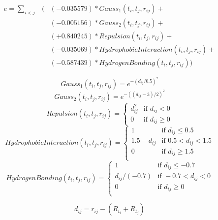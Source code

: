 \begin{eqnarray}
\label{eqn:ScoringFunction}
e = \sum_{i < j} &\Big(&(-0.035579) * Gauss_1(t_i, t_j, r_{ij}) + \nonumber \\
&&(-0.005156) * Gauss_2(t_i, t_j, r_{ij}) + \nonumber \\
&&(+0.840245) * Repulsion(t_i, t_j, r_{ij}) + \nonumber \\
&&(-0.035069) * HydrophobicInteraction(t_i, t_j, r_{ij}) + \nonumber \\
&&(-0.587439) * HydrogenBonding(t_i, t_j, r_{ij})\Big)
\end{eqnarray}

\begin{equation}
\label{eqn:Gauss1}
Gauss_1(t_i, t_j, r_{ij}) = e^{-(d_{ij} / 0.5)^2}
\end{equation}
\begin{equation}
\label{eqn:Gauss2}
Gauss_2(t_i, t_j, r_{ij}) = e^{-((d_{ij} - 3) / 2)^2}
\end{equation}
\begin{equation}
\label{eqn:Repulsion}
Repulsion(t_i, t_j, r_{ij}) =
\begin{cases}
d_{ij}^2 & \text{if } d_{ij} < 0\\
0 &\text{if } d_{ij} \geq 0
\end{cases}
\end{equation}
\begin{equation}
\label{eqn:HydrophobicInteraction}
HydrophobicInteraction(t_i, t_j, r_{ij}) =
\begin{cases}
1 & \text{if } d_{ij} \leq 0.5\\
1.5 - d_{ij} & \text{if } 0.5 < d_{ij} < 1.5\\
0 & \text{if } d_{ij} \geq 1.5\\
\end{cases}
\end{equation}
\begin{equation}
\label{eqn:HydrogenBonding}
HydrogenBonding(t_i, t_j, r_{ij}) =
\begin{cases}
1 & \text{if } d_{ij} \leq -0.7\\
d_{ij} / (-0.7) & \text{if } -0.7 < d_{ij} < 0\\
0 & \text{if } d_{ij} \geq 0\\
\end{cases}
\end{equation}

\begin{equation}
\label{eqn:SurfaceDistance}
d_{ij} = r_{ij} - (R_{t_i} + R_{t_j})
\end{equation}

